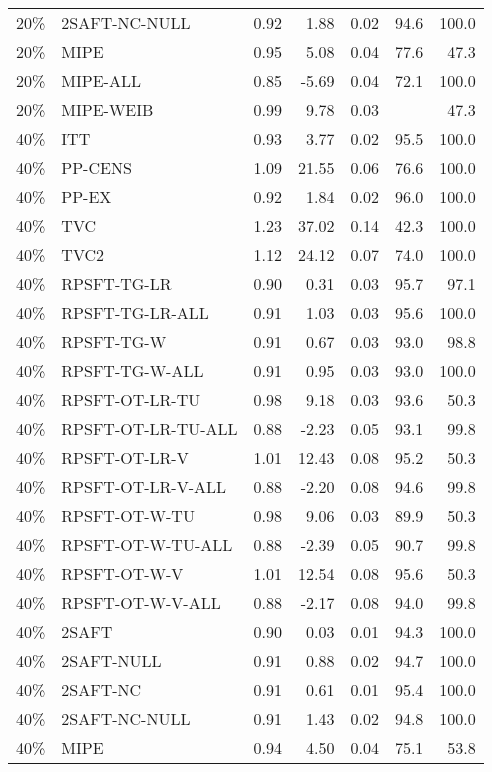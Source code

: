 \begin{table}[ht]
{\begin{tabular}{llrrrrr}
  20\% & 2SAFT-NC-NULL & 0.92 & 1.88 & 0.02 & 94.6 & 100.0 \\ 
  20\% & MIPE & 0.95 & 5.08 & 0.04 & 77.6 & 47.3 \\ 
  20\% & MIPE-ALL & 0.85 & -5.69 & 0.04 & 72.1 & 100.0 \\ 
  20\% & MIPE-WEIB & 0.99 & 9.78 & 0.03 &  & 47.3 \\ 
   \hline
40\% & ITT & 0.93 & 3.77 & 0.02 & 95.5 & 100.0 \\ 
  40\% & PP-CENS & 1.09 & 21.55 & 0.06 & 76.6 & 100.0 \\ 
  40\% & PP-EX & 0.92 & 1.84 & 0.02 & 96.0 & 100.0 \\ 
  40\% & TVC & 1.23 & 37.02 & 0.14 & 42.3 & 100.0 \\ 
  40\% & TVC2 & 1.12 & 24.12 & 0.07 & 74.0 & 100.0 \\ 
   \hline
40\% & RPSFT-TG-LR & 0.90 & 0.31 & 0.03 & 95.7 & 97.1 \\ 
  40\% & RPSFT-TG-LR-ALL & 0.91 & 1.03 & 0.03 & 95.6 & 100.0 \\ 
  40\% & RPSFT-TG-W & 0.91 & 0.67 & 0.03 & 93.0 & 98.8 \\ 
  40\% & RPSFT-TG-W-ALL & 0.91 & 0.95 & 0.03 & 93.0 & 100.0 \\ 
  40\% & RPSFT-OT-LR-TU & 0.98 & 9.18 & 0.03 & 93.6 & 50.3 \\ 
  40\% & RPSFT-OT-LR-TU-ALL & 0.88 & -2.23 & 0.05 & 93.1 & 99.8 \\ 
  40\% & RPSFT-OT-LR-V & 1.01 & 12.43 & 0.08 & 95.2 & 50.3 \\ 
  40\% & RPSFT-OT-LR-V-ALL & 0.88 & -2.20 & 0.08 & 94.6 & 99.8 \\ 
   \hline
40\% & RPSFT-OT-W-TU & 0.98 & 9.06 & 0.03 & 89.9 & 50.3 \\ 
  40\% & RPSFT-OT-W-TU-ALL & 0.88 & -2.39 & 0.05 & 90.7 & 99.8 \\ 
  40\% & RPSFT-OT-W-V & 1.01 & 12.54 & 0.08 & 95.6 & 50.3 \\ 
  40\% & RPSFT-OT-W-V-ALL & 0.88 & -2.17 & 0.08 & 94.0 & 99.8 \\ 
   \hline
40\% & 2SAFT & 0.90 & 0.03 & 0.01 & 94.3 & 100.0 \\ 
  40\% & 2SAFT-NULL & 0.91 & 0.88 & 0.02 & 94.7 & 100.0 \\ 
  40\% & 2SAFT-NC & 0.91 & 0.61 & 0.01 & 95.4 & 100.0 \\ 
  40\% & 2SAFT-NC-NULL & 0.91 & 1.43 & 0.02 & 94.8 & 100.0 \\ 
  40\% & MIPE & 0.94 & 4.50 & 0.04 & 75.1 & 53.8 \\ 

\end{tabular}}
\end{table}
